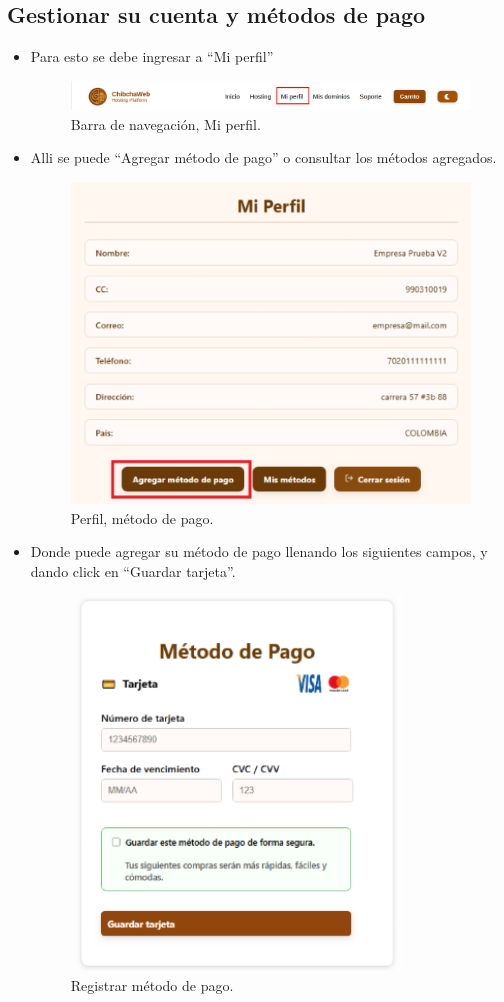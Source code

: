 \subsection{Gestionar su cuenta y métodos de pago}
\begin{itemize}
    \item Para esto se debe ingresar a “Mi perfil”
    \begin{figure}[H]
        \centering
    \includegraphics[width=0.8\linewidth]{guiamodulo/navbar-miperfil.png}
    \caption{Barra de navegación, Mi perfil.}
    \label{fig:navbar-miperfil}
    \end{figure}

     \item Alli se puede “Agregar método de pago” o consultar los métodos agregados.
     \begin{figure}[H]
         \centering
     \includegraphics[width=0.6\linewidth]{guiamodulo/perfil-metodopago.png}
     \caption{Perfil, método de pago.}
     \label{fig:perfil-metodopago}
     \end{figure}

     \item Donde puede agregar su método de pago llenando los siguientes campos, y dando click en “Guardar tarjeta”.
     \begin{figure}[H]
         \centering
     \includegraphics[width=0.5\linewidth]{guiamodulo/metodopago.png}
     \caption{Registrar método de pago.}
     \label{fig:metodopago}
     \end{figure}
\end{itemize}


